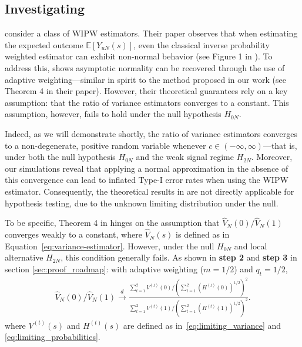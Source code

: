 \documentclass[12pt]{article}
\newcommand{\E}{\mathbb E}								%
\newcommand{\convd}{\overset d \rightarrow}             %
\begin{document}
\subsection{Investigating \citet{Hadad2021}}\label{sec:inspection_Victor}


\citet{Hadad2021} consider a class of WIPW estimators. Their paper observes that when estimating the expected outcome $\E[Y_{uN}(s)]$, even the classical inverse probability weighted estimator can exhibit non-normal behavior (see Figure 1 in \citeauthor{Hadad2021}). To address this, \citet{Hadad2021} shows asymptotic normality can be recovered through the use of adaptive weighting—similar in spirit to the method proposed in our work (see Theorem 4 in their paper). However, their theoretical guarantees rely on a key assumption: that the ratio of variance estimators converges to a constant. This assumption, however, fails to hold under the null hypothesis $H_{0N}$.

Indeed, as we will demonstrate shortly, the ratio of variance estimators converges to a non-degenerate, positive random variable whenever $c \in (-\infty, \infty)$—that is, under both the null hypothesis $H_{0N}$ and the weak signal regime $H_{2N}$. Moreover, our simulations reveal that applying a normal approximation in the absence of this convergence can lead to inflated Type-I error rates when using the WIPW estimator. Consequently, the theoretical results in \citet{Hadad2021} are not directly applicable for hypothesis testing, due to the unknown limiting distribution under the null.
 
To be specific, Theorem 4 in \citet{Hadad2021} hinges on the assumption that $\hat V_N(0)/\hat V_N(1)$ converges weakly to a constant, where $\hat V_N(s)$ is defined as in Equation~\eqref{eq:variance-estimator}. However, under the null $H_{0N}$ and local alternative $H_{2N}$, this condition generally fails. As shown in \textbf{step 2} and \textbf{step 3} in section \ref{sec:proof_roadmap}: 
with adaptive weighting ($m=1/2$) and $q_t=1/2$,
\begin{align}\label{eq:variance-ratio-convergence}
	\hat V_N(0)/\hat V_N(1)\convd \frac{\sum_{t=1}^2 V^{(t)}(0)/ (\sum_{t=1}^2 (H^{(t)}(0))^{1/2})^2}{\sum_{t=1}^2 V^{(t)}(1)/ (\sum_{t=1}^2 (H^{(t)}(1))^{1/2})^2}.
\end{align}
where $V^{(t)}(s)$ and $H^{(t)}(s)$ are defined as in~\eqref{eq:limiting_variance} and \eqref{eq:limiting_probabilities}.
\end{document}
